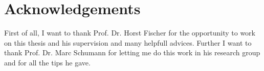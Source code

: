 \chapter{Acknowledgements}
First of all, I want to thank Prof. Dr. Horst Fischer for the opportunity to work on this thesis and his supervision and many helpfull advices.
Further I want to thank Prof. Dr. Marc Schumann for letting me do this work in his research group and for all the tips he gave.

